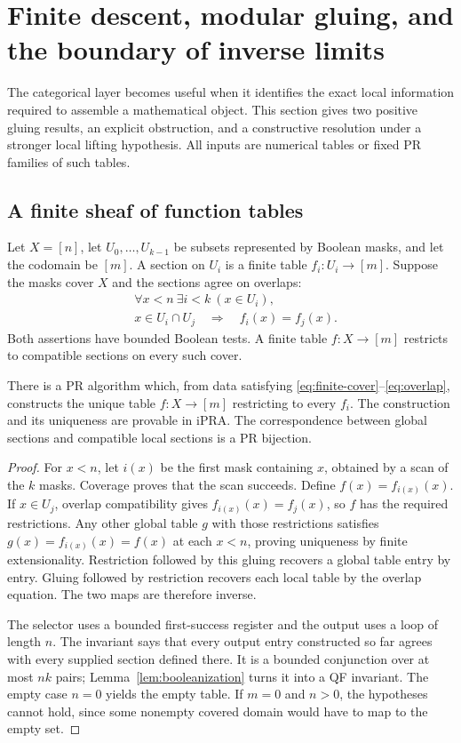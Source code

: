 \section{Finite descent, modular gluing, and the boundary of inverse limits}
\label{sec:descent}

The categorical layer becomes useful when it identifies the exact local
information required to assemble a mathematical object. This section gives
two positive gluing results, an explicit obstruction, and a constructive
resolution under a stronger local lifting hypothesis. All inputs are numerical
tables or fixed PR families of such tables.

\subsection{A finite sheaf of function tables}

Let $X=[n]$, let $U_0,\ldots,U_{k-1}$ be subsets represented by Boolean masks,
and let the codomain be $[m]$. A section on $U_i$ is a finite table
$f_i:U_i\to[m]$. Suppose the masks cover $X$ and the sections agree on
overlaps:
\begin{align}
 &\forall x<n\ \exists i<k\ (x\in U_i),\label{eq:finite-cover}\\
 &x\in U_i\cap U_j\quad\Longrightarrow\quad f_i(x)=f_j(x).
 \label{eq:overlap}
\end{align}
Both assertions have bounded Boolean tests. A finite table $f:X\to[m]$
restricts to compatible sections on every such cover.

\begin{theorem}
\label{thm:finite-glue}
There is a PR algorithm which, from data satisfying
\eqref{eq:finite-cover}--\eqref{eq:overlap}, constructs the unique table
$f:X\to[m]$ restricting to every $f_i$. The construction and its
uniqueness are provable in iPRA. The correspondence between global sections
and compatible local sections is a PR bijection.
\end{theorem}

\begin{proof}
For $x<n$, let $i(x)$ be the first mask containing $x$, obtained by a scan of
the $k$ masks. Coverage proves that the scan succeeds. Define
$f(x)=f_{i(x)}(x)$. If $x\in U_j$, overlap compatibility gives
$f_{i(x)}(x)=f_j(x)$, so $f$ has the required restrictions.
Any other global table $g$ with those restrictions satisfies
$g(x)=f_{i(x)}(x)=f(x)$ at each $x<n$, proving uniqueness by finite
extensionality. Restriction followed by this gluing recovers a global table
entry by entry. Gluing followed by restriction recovers each local table by
the overlap equation. The two maps are therefore inverse.

The selector uses a bounded first-success register and the output uses a
loop of length $n$. The invariant says that every output entry constructed
so far agrees with every supplied section defined there. It is a bounded
conjunction over at most $nk$ pairs; Lemma~\ref{lem:booleanization} turns it
into a QF invariant. The empty case $n=0$ yields the empty table. If $m=0$
and $n>0$, the hypotheses cannot hold, since some nonempty covered domain
would have to map to the empty set.
\end{proof}

